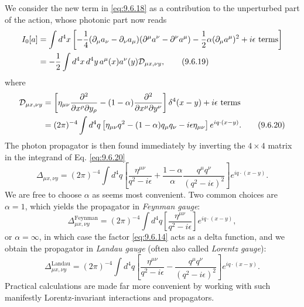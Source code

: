 We consider the new term in \eqref{eq:9.6.18} as a contribution to the unperturbed part
of the action, whose photonic part now reads
\begin{align}
I_0[a]
&=\int d^4x\left[-\frac14(\partial_\mu a_\nu-\partial_\nu a_\mu)
 (\partial^\mu a^\nu-\partial^\nu a^\mu)
 -\frac12\alpha(\partial_\mu a^\mu)^2+i\epsilon\text{ terms}\right]
\notag\\
&=-\frac12\int d^4x\,d^4y\,a^\mu(x)a^\nu(y)
 \mathcal D_{\mu x,\nu y},
\tag{9.6.19}\label{eq:9.6.19}
\end{align}
where
\begin{align}
\mathcal D_{\mu x,\nu y}
&=\left[\eta_{\mu\nu}
 \frac{\partial^2}{\partial x^\rho\partial y_\rho}
 -(1-\alpha)\frac{\partial^2}{\partial x^\mu\partial y^\nu}\right]
 \delta^4(x-y)+i\epsilon\text{ terms}
\notag\\
&=(2\pi)^{-4}\int d^4q\left[
 \eta_{\mu\nu}q^2-(1-\alpha)q_\mu q_\nu-i\epsilon\eta_{\mu\nu}\right]
 e^{iq\cdot(x-y)}.
\tag{9.6.20}\label{eq:9.6.20}
\end{align}
The photon propagator is then found immediately by inverting the $4\times4$
matrix in the integrand of Eq. \eqref{eq:9.6.20}
\begin{equation}
\Delta_{\mu x,\nu y}=(2\pi)^{-4}\int d^4q\left[
 \frac{\eta^{\mu\nu}}{q^2-i\epsilon}
 +\frac{1-\alpha}{\alpha}\frac{q^\mu q^\nu}{(q^2-i\epsilon)^2}\right]
 e^{iq\cdot(x-y)}.
\tag{9.6.21}\label{eq:9.6.21}
\end{equation}
We are free to choose $\alpha$ as seems most convenient. Two common choices
are $\alpha=1$, which yields the propagator in \emph{Feynman gauge}:
\begin{equation}
\Delta^{\mathrm{Feynman}}_{\mu x,\nu y}
=(2\pi)^{-4}\int d^4q\left[\frac{\eta^{\mu\nu}}{q^2-i\epsilon}\right]
 e^{iq\cdot(x-y)},
\tag{9.6.22}\label{eq:9.6.22}
\end{equation}
or $\alpha=\infty$, in which case the factor \eqref{eq:9.6.14} acts as a delta function,
and we obtain the propagator in \emph{Landau gauge} (often also called
\emph{Lorentz gauge}):
\begin{equation}
\Delta^{\mathrm{Landau}}_{\mu x,\nu y}
=(2\pi)^{-4}\int d^4q\left[
 \frac{\eta^{\mu\nu}}{q^2-i\epsilon}
 -\frac{q^\mu q^\nu}{(q^2-i\epsilon)^2}\right]e^{iq\cdot(x-y)}.
\tag{9.6.23}\label{eq:9.6.23}
\end{equation}
Practical calculations are made far more convenient by working with such
manifestly Lorentz-invariant interactions and propagators.
